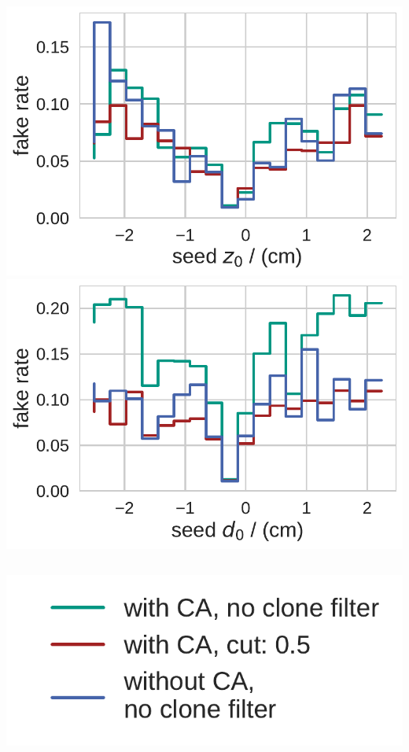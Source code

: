 \documentclass[18pt, aspectratio=169]{beamer}
\begin{document}
\begin{frame}
\begin{columns}
    \begin{column}{.5\textwidth}
      \centering
      \includegraphics[width=.55\textwidth]{figures/fake_rate_by_z0_truth_fullreco_trainedWithFakes.pdf}\\
      \includegraphics[width=.55\textwidth]{figures/fake_rate_by_d0_truth_fullreco_trainedWithFakes.pdf}      
    \end{column}
  \end{columns}
  \begin{center}
    \includegraphics[width=.25\textwidth]{figures/legend_fom_profile.pdf}\\
  \end{center}  
\end{frame}
\end{document}
